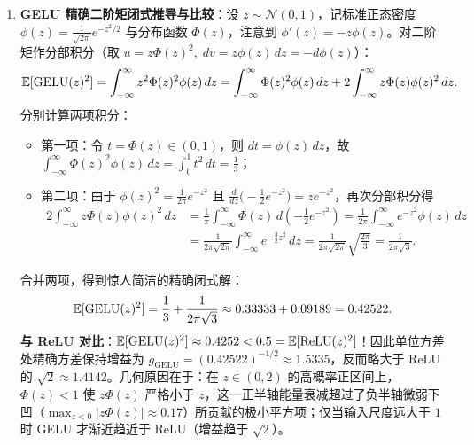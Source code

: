 \begin{enumerate}[label=(\alph*), leftmargin=1.8em]
  \item \textbf{GELU 精确二阶矩闭式推导与比较}：设 $z \sim \mathcal{N}(0, 1)$，记标准正态密度 $\phi(z) = \frac{1}{\sqrt{2\pi}}e^{-z^2/2}$ 与分布函数 $\Phi(z)$，注意到 $\phi'(z) = -z\phi(z)$。对二阶矩作分部积分（取 $u = z\Phi(z)^2,\; dv = z\phi(z)\,dz = -d\phi(z)$）：
  \[
    \mathbb{E}[\operatorname{GELU}(z)^2]
    = \int_{-\infty}^\infty z^2 \Phi(z)^2 \phi(z)\,dz
    = \int_{-\infty}^\infty \Phi(z)^2 \phi(z)\,dz + 2\int_{-\infty}^\infty z \Phi(z) \phi(z)^2\,dz.
  \]
  分别计算两项积分：
  \begin{itemize}
    \item 第一项：令 $t = \Phi(z) \in (0, 1)$，则 $dt = \phi(z)\,dz$，故 $\int_{-\infty}^\infty \Phi(z)^2 \phi(z)\,dz = \int_0^1 t^2\,dt = \frac{1}{3}$；
    \item 第二项：由于 $\phi(z)^2 = \frac{1}{2\pi} e^{-z^2}$ 且 $\frac{d}{dz}\big(-\frac{1}{2}e^{-z^2}\big) = z e^{-z^2}$，再次分部积分得
    \begin{align*}
      2\int_{-\infty}^\infty z \Phi(z) \phi(z)^2\,dz
      &= \frac{1}{\pi}\int_{-\infty}^\infty \Phi(z)\, d\!\left(-\frac{1}{2}e^{-z^2}\right)
       = \frac{1}{2\pi}\int_{-\infty}^\infty e^{-z^2}\phi(z)\,dz \\
      &= \frac{1}{2\pi\sqrt{2\pi}}\int_{-\infty}^\infty e^{-\frac{3}{2}z^2}\,dz
       = \frac{1}{2\pi\sqrt{2\pi}}\sqrt{\frac{2\pi}{3}}
       = \frac{1}{2\pi\sqrt{3}}.
    \end{align*}
  \end{itemize}
  合并两项，得到惊人简洁的精确闭式解：
  \[
    \mathbb{E}[\operatorname{GELU}(z)^2] = \frac{1}{3} + \frac{1}{2\pi\sqrt{3}} \approx 0.33333 + 0.09189 = 0.42522.
  \]
  \textbf{与 ReLU 对比}：$\mathbb{E}[\operatorname{GELU}(z)^2] \approx 0.4252 < 0.5 = \mathbb{E}[\operatorname{ReLU}(z)^2]$！因此单位方差处精确方差保持增益为 $g_{\text{GELU}} = (0.42522)^{-1/2} \approx 1.5335$，反而略大于 ReLU 的 $\sqrt{2} \approx 1.4142$。几何原因在于：在 $z \in (0, 2)$ 的高概率正区间上，$\Phi(z) < 1$ 使 $z\Phi(z)$ 严格小于 $z$，这一正半轴能量衰减超过了负半轴微弱下凹（$\max_{z<0}|z\Phi(z)| \approx 0.17$）所贡献的极小平方项；仅当输入尺度远大于 $1$ 时 GELU 才渐近趋近于 ReLU（增益趋于 $\sqrt{2}$）。
\end{enumerate}

